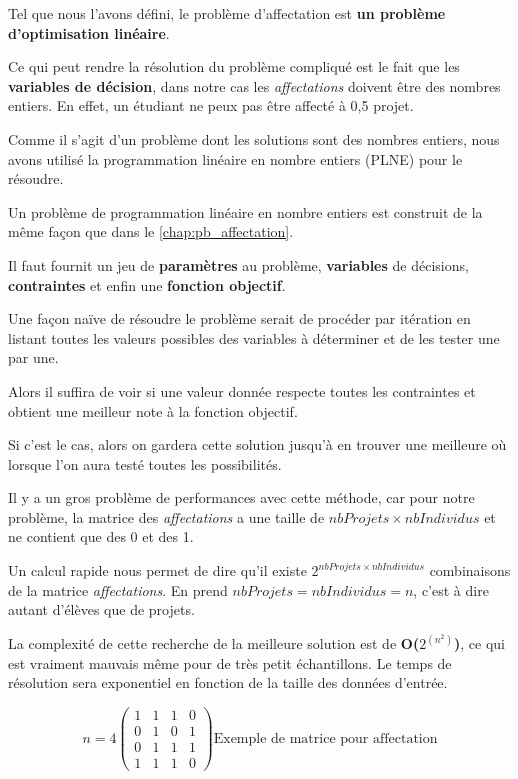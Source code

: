 \documentclass{polytech/polytech}
\begin{document}
Tel que nous l'avons défini, le problème d'affectation est \textbf{un problème d'optimisation linéaire}. 

Ce qui peut rendre la résolution du problème compliqué est le fait que les \textbf{variables de décision}, dans notre cas les \textit{affectations} doivent être des nombres entiers. En effet, un étudiant ne peux pas être affecté à 0,5 projet.

Comme il s'agit d'un problème dont les solutions sont des nombres entiers, nous avons utilisé la programmation linéaire en nombre entiers (PLNE) pour le résoudre. 

Un problème de programmation linéaire en nombre entiers est construit de la même façon que dans le \autoref{chap:pb_affectation}. 

Il faut fournit un jeu de \textbf{paramètres} au problème, \textbf{variables} de décisions, \textbf{contraintes} et enfin une \textbf{fonction objectif}.


Une façon naïve de résoudre le problème serait de procéder par itération en listant toutes les valeurs possibles des variables à déterminer et de les tester une par une. 

Alors il suffira de voir si une valeur donnée respecte toutes les contraintes et obtient une meilleur note à la fonction objectif.

 Si c'est le cas, alors on gardera cette solution jusqu'à en trouver une meilleure où lorsque l'on aura testé toutes les possibilités.

Il y a un gros problème de performances avec cette méthode, car pour notre problème, la matrice des \textit{affectations} a une taille de $nbProjets\times nbIndividus$ et ne contient que des 0 et des 1.

Un calcul rapide nous permet de dire qu'il existe $2^{nbProjets\times nbIndividus}$ combinaisons de la matrice \textit{affectations}.
En prend $nbProjets=nbIndividus=n$, c'est à dire autant d'élèves que de projets.

La complexité de cette recherche de la meilleure solution est de \textbf{O($2^{(n^2)}$)}, ce qui est vraiment mauvais même pour de très petit échantillons. Le temps de résolution sera exponentiel en fonction de la taille des données d'entrée.

\begin{equation}
n=4
\left(
\begin{array}{cccc}
1 & 1 & 1 & 0 \\ 
0 & 1 & 0 & 1 \\ 
0 & 1 & 1 & 1 \\ 
1 & 1 & 1 & 0
\end{array} 
\right)
\text{Exemple de matrice pour affectation}
\end{equation}
\end{document}
